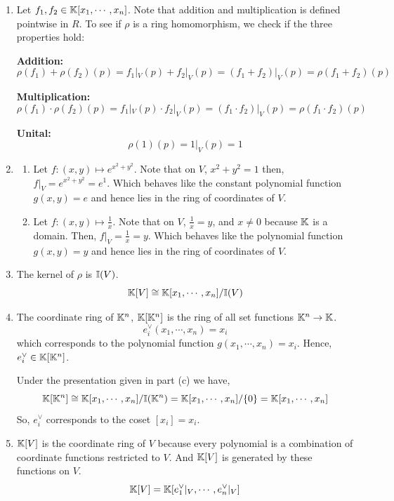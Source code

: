 \documentclass[Notebook.tex]{subfiles}
\begin{document}
\begin{solution}
    \bbni 
    \begin{enumerate}[label=(\alph*),ref=\theenumi\alph*]
        \item Let $f_1, f_2 \in \mathbb K[x_1, \cdots, x_n]$. Note that addition and multiplication is defined pointwise in $R$. To see if $\rho$ is a ring homomorphism, we check if the three properties hold: 

        \textbf{Addition: }
        \[\rho(f_1) + \rho(f_2)(p) = f_1|_V(p) + f_2|_V(p) = (f_1+f_2)|_V(p) = \rho(f_1+f_2)(p)\]


        \textbf{Multiplication: }
        \[\rho(f_1) \cdot \rho(f_2)(p) = f_1|_V(p) \cdot f_2|_V(p) = (f_1\cdot f_2)|_V(p) = \rho(f_1\cdot f_2)(p)\]

        \textbf{Unital:}
        \[\rho(1)(p) = 1|_V(p) = 1\]

	    \item 
        \begin{enumerate}[label=(\roman*), ref=\theenumi\roman*]
            \item Let $f: (x,y) \mapsto e^{x^2 + y^2}$. Note that on $V$, $x^2 + y^2 = 1$ then, $f|_V = e^{x^2+y^2} = e^1$. Which behaves like the constant polynomial function $g(x,y) = e$ and hence lies in the ring of coordinates of $V$. 
            \item Let $f: (x,y) \mapsto \frac{1}{x}$. Note that on $V$, $\frac{1}{x}= y$, and $x \neq 0$ because $\mathbb K$ is a domain. Then, $f|_V = \frac{1}{x} = y$. Which behaves like the polynomial function $g(x,y) = y$ and hence lies in the ring of coordinates of $V$. 
        \end{enumerate}

        \item The kernel of $\rho$ is $\mathbb I(V)$. 
        \[\mathbb K[V] \cong \mathbb K[x_1, \cdots, x_n] / \mathbb I(V)\]

        \item The coordinate ring of $\mathbb K^n$, $\mathbb K[\mathbb K^n]$ is the ring of all set functions $\mathbb K^n \to \mathbb K$. 
        \[e_i^\vee (x_1, \cdots, x_n) = x_i\]
        which corresponds to the polynomial function $g(x_1, \cdots, x_n) = x_i$. Hence, $e_i^\vee \in \mathbb K[\mathbb K^n]$. 

        Under the presentation given in part (c) we have, 
        \[\mathbb K[\mathbb K^n] \cong \mathbb K[x_1, \cdots, x_n] / \mathbb I(\mathbb K^n) = \mathbb K[x_1, \cdots, x_n] / \{0\} = \mathbb K[x_1, \cdots, x_n] \]
        So, $e_i^\vee$ corresponds to the coset $[x_i] = x_i$. 

        \item $\mathbb K[V]$ is the coordinate ring of $V$ because every polynomial is a combination of coordinate functions restricted to $V$. And $\mathbb K[V]$ is generated by these functions on $V$. 
        \[\mathbb K[V] = \mathbb K[e_1^\vee|_V, \cdots, e_n^\vee |_V]\]
        

\end{enumerate}
\end{solution}
\end{document}
